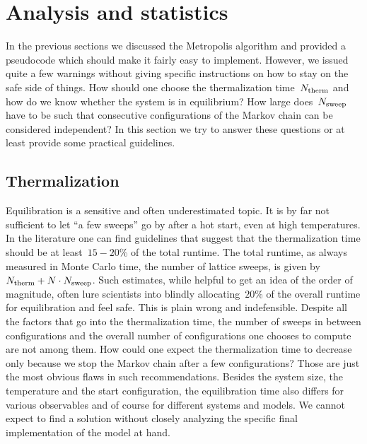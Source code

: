 %
\section{Analysis and statistics}\label{sec:analysis}
%
In the previous sections we discussed the Metropolis algorithm and provided a
pseudocode which should make it fairly easy to implement. However, we issued
quite a few warnings without giving specific instructions on how to stay on the
safe side of things. How should one choose the thermalization time~$N_{\mathrm{therm}}$ and
how do we know whether the system is in equilibrium? How large does~$N_{\mathrm{sweep}}$
have to be such that consecutive configurations of the Markov chain can be
considered independent? In this section we try to answer these questions or at
least provide some practical guidelines.

\subsection{Thermalization}

Equilibration is a sensitive and often underestimated topic. It is by far not
sufficient to let ``a few sweeps'' go by after a hot start, even at high
temperatures. In the literature one can find guidelines that suggest that the
thermalization time should be at least~$15-20$\% of the total runtime. The total
runtime, as always measured in Monte Carlo time, \ie{} the number of lattice
sweeps, is given by~$N_{\mathrm{therm}} + N\cdot N_{\mathrm{sweep}}$. Such estimates, while helpful to
get an idea of the order of magnitude, often lure scientists into blindly
allocating~$20$\% of the overall runtime for equilibration and feel safe. This
is plain wrong and indefensible. Despite all the factors that go into the
thermalization time, the number of sweeps in between configurations and the
overall number of configurations one chooses to compute are not among them. How
could one expect the thermalization time to decrease only because we stop the
Markov chain after a few configurations? Those are just the most obvious flaws
in such recommendations. Besides the system size, the temperature and the
start configuration, the equilibration time also differs for various observables
and of course for different systems and models. We cannot expect to find a
solution without closely analyzing the specific final implementation of the
model at hand.

